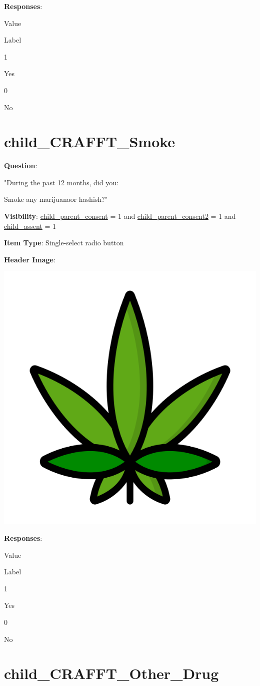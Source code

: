 \documentclass[]{book}
\begin{document}
\textbf{Responses}:

Value

Label

1

Yes

0

No

\hypertarget{child_crafft_smoke}{%
\section{child\_CRAFFT\_Smoke}\label{child_crafft_smoke}}

\textbf{Question}:

"During the past 12 months, did you:

Smoke any marijuanaor hashish?"

\textbf{Visibility}: \protect\hyperlink{child_parent_consent}{child\_parent\_consent} = 1 and \protect\hyperlink{child_parent_consent2}{child\_parent\_consent2} = 1 and \protect\hyperlink{child_assent}{child\_assent} = 1

\textbf{Item Type}: Single-select radio button

\textbf{Header Image}:

\begin{flushleft}\includegraphics[width=0.33\linewidth]{downloadFigs4latex_HBN_PMHS_Codebook/child_CRAFFT_Smoke_headerImg} \end{flushleft}

\textbf{Responses}:

Value

Label

1

Yes

0

No

\hypertarget{child_crafft_other_drug}{%
\section{child\_CRAFFT\_Other\_Drug}\label{child_crafft_other_drug}}
\end{document}
